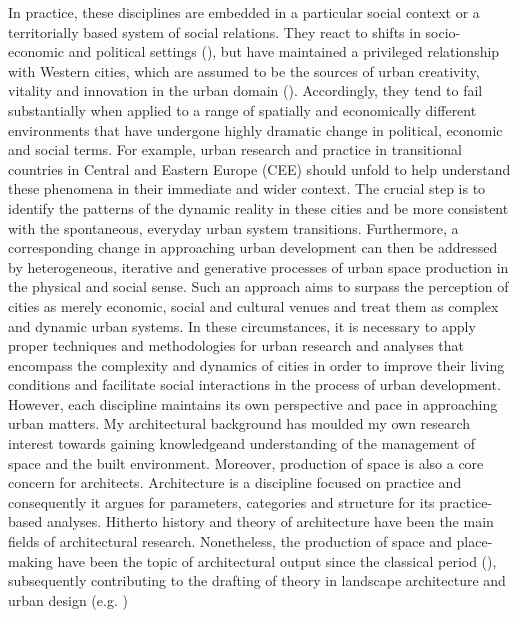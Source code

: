 \documentclass[11pt]{report}
\begin{document}
In practice, these disciplines are embedded in a particular social context or a territorially based system of social relations. They react to shifts in socio-economic and political settings  (\href{Tsenkova, 2006b}{\citealt{Tsenkova, 2006b}}), but have maintained a privileged relationship with Western cities, which are assumed to be the sources of urban creativity, vitality and innovation in the urban domain (\href{Robinson, 2006:2}{\citealt{Robinson, 2006:2}}). Accordingly, they   tend to fail substantially when applied to a range of spatially and economically different environments that have undergone highly dramatic change in political, economic and social terms. For example, urban research and practice in transitional countries in Central and Eastern Europe (CEE) should unfold to help understand these phenomena in their immediate and wider context. The crucial step   is to identify the patterns of the dynamic reality in these cities and be more consistent with the spontaneous, everyday urban system transitions. Furthermore, a corresponding change in approaching urban development can then be addressed by heterogeneous, iterative and generative processes of urban space production in the physical and social sense. Such an approach aims to surpass the perception of cities as merely economic, social and cultural venues and treat them as complex and dynamic urban systems. In these circumstances, it is necessary to apply proper techniques and methodologies for urban research and analyses that encompass the complexity and dynamics of cities in order to improve their living conditions and facilitate social interactions in the process of urban development.
\\
However, each discipline maintains its own perspective and pace in approaching urban matters. My architectural background has moulded my own research interest towards gaining knowledgeand understanding of the management of space and the built environment. Moreover, production of space is also a core concern for architects. Architecture is a discipline focused on practice and consequently it argues for parameters, categories and structure for its practice-based analyses.  
Hitherto history and theory of architecture have been the main fields of architectural research.
Nonetheless, the production of space and place-making have been the topic of architectural output since the classical period  (\href{Braunfels, 1990; Rossi, 1982; Vitruvius, 20BC; from Van Assche et al. 2013}{\citealt{Braunfels, 1990; Rossi, 1982; Vitruvius, 20BC; from Van Assche et al. 2013}}), subsequently contributing to the drafting of theory in landscape architecture and urban design (e.g. \href{Child, 2010; Braunfels, 1990; Rossi, 1982; Duany and Plater-Zyberk, 1991; Lynch, 1981 from Van Assche et al. 2013}{\citealt{Child, 2010; Braunfels, 1990; Rossi, 1982; Duany and Plater-Zyberk, 1991; Lynch, 1981 from Van Assche et al. 2013}})
\end{document}

